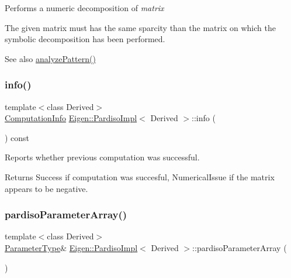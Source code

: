 Performs a numeric decomposition of {\itshape matrix} 

The given matrix must has the same sparcity than the matrix on which the symbolic decomposition has been performed.

\begin{DoxySeeAlso}{See also}
\mbox{\hyperlink{class_eigen_1_1_pardiso_impl_af1773ce06014b55a69cd42daf34eeec4}{analyze\+Pattern()}} 
\end{DoxySeeAlso}
\mbox{\label{class_eigen_1_1_pardiso_impl_a7dce1175518593e33d32e30ab0ffee3b}} 
\subsubsection{\texorpdfstring{info()}{info()}}
{\footnotesize\ttfamily template$<$class Derived$>$ \\
\mbox{\hyperlink{group__enums_ga85fad7b87587764e5cf6b513a9e0ee5e}{Computation\+Info}} \mbox{\hyperlink{class_eigen_1_1_pardiso_impl}{Eigen\+::\+Pardiso\+Impl}}$<$ Derived $>$\+::info (\begin{DoxyParamCaption}{ }\end{DoxyParamCaption}) const\hspace{0.3cm}{\ttfamily [inline]}}



Reports whether previous computation was successful. 

\begin{DoxyReturn}{Returns}
{\ttfamily Success} if computation was succesful, {\ttfamily Numerical\+Issue} if the matrix appears to be negative. 
\end{DoxyReturn}
\mbox{\label{class_eigen_1_1_pardiso_impl_a42a7983796076edc52e0e8d2869610ec}} 
\subsubsection{\texorpdfstring{pardisoParameterArray()}{pardisoParameterArray()}}
{\footnotesize\ttfamily template$<$class Derived$>$ \\
\mbox{\hyperlink{class_eigen_1_1_array}{Parameter\+Type}}\& \mbox{\hyperlink{class_eigen_1_1_pardiso_impl}{Eigen\+::\+Pardiso\+Impl}}$<$ Derived $>$\+::pardiso\+Parameter\+Array (\begin{DoxyParamCaption}{ }\end{DoxyParamCaption})\hspace{0.3cm}{\ttfamily [inline]}}

